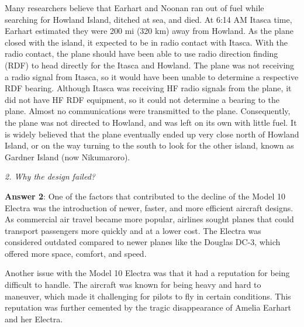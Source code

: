 Many researchers believe that Earhart and Noonan ran out of fuel while searching for Howland Island, ditched at sea, and died.
At 6:14 AM Itasca time, Earhart estimated they were 200 mi (320 km) away from Howland. As the plane closed with the island, it expected to be in radio contact with Itasca. With the radio contact, the plane should have been able to use radio direction finding (RDF) to head directly for the Itasca and Howland. The plane was not receiving a radio signal from Itasca, so it would have been unable to determine a respective RDF bearing. Although Itasca was receiving HF radio signals from the plane, it did not have HF RDF equipment, so it could not determine a bearing to the plane. Almost no communications were transmitted to the plane. Consequently, the plane was not directed to Howland, and was left on its own with little fuel.
It is widely believed that the plane eventually ended up very close north of Howland Island, or on the way
turning to the south to look for the other island, known as Gardner Island (now Nikumaroro).


\vspace{1em}
\textit{2. Why the design failed?}
\vspace{1em}

\textbf{Answer 2}:
One of the factors that contributed to the decline of the Model 10 Electra was the introduction of newer, faster, and more efficient aircraft designs. As commercial air travel became more popular, airlines sought planes that could transport passengers more quickly and at a lower cost. The Electra was considered outdated compared to newer planes like the Douglas DC-3, which offered more space, comfort, and speed.

Another issue with the Model 10 Electra was that it had a reputation for being difficult to handle. The aircraft was known for being heavy and hard to maneuver, which made it challenging for pilots to fly in certain conditions. This reputation was further cemented by the tragic disappearance of Amelia Earhart and her Electra.